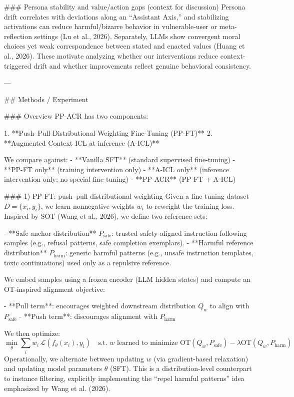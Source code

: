 ### Persona stability and value/action gaps (context for discussion)  
Persona drift correlates with deviations along an “Assistant Axis,” and stabilizing activations can reduce harmful/bizarre behavior in vulnerable-user or meta-reflection settings (Lu et al., 2026). Separately, LLMs show convergent moral choices yet weak correspondence between stated and enacted values (Huang et al., 2026). These motivate analyzing whether our interventions reduce context-triggered drift and whether improvements reflect genuine behavioral consistency.

---

## Methods / Experiment  

### Overview  
PP-ACR has two components:

1. **Push–Pull Distributional Weighting Fine-Tuning (PP-FT)**  
2. **Augmented Context ICL at inference (A-ICL)**  

We compare against:  
- **Vanilla SFT** (standard supervised fine-tuning)  
- **PP-FT only** (training intervention only)  
- **A-ICL only** (inference intervention only; no special fine-tuning)  
- **PP-ACR** (PP-FT + A-ICL)

### 1) PP-FT: push–pull distributional weighting  
Given a fine-tuning dataset \(D=\{x_i,y_i\}\), we learn nonnegative weights \(w_i\) to reweight the training loss. Inspired by SOT (Wang et al., 2026), we define two reference sets:

- **Safe anchor distribution** \(P_{\text{safe}}\): trusted safety-aligned instruction-following samples (e.g., refusal patterns, safe completion exemplars).  
- **Harmful reference distribution** \(P_{\text{harm}}\): generic harmful patterns (e.g., unsafe instruction templates, toxic continuations) used only as a repulsive reference.

We embed samples using a frozen encoder (LLM hidden states) and compute an OT-inspired alignment objective:

- **Pull term**: encourages weighted downstream distribution \(Q_w\) to align with \(P_{\text{safe}}\)  
- **Push term**: discourages alignment with \(P_{\text{harm}}\)

We then optimize:
\[
\min_{\theta}\sum_i w_i \,\mathcal{L}(f_\theta(x_i),y_i)
\quad \text{s.t. } w \text{ learned to minimize } \text{OT}(Q_w,P_{\text{safe}}) - \lambda \text{OT}(Q_w,P_{\text{harm}})
\]
Operationally, we alternate between updating \(w\) (via gradient-based relaxation) and updating model parameters \(\theta\) (SFT). This is a distribution-level counterpart to instance filtering, explicitly implementing the “repel harmful patterns” idea emphasized by Wang et al. (2026).

